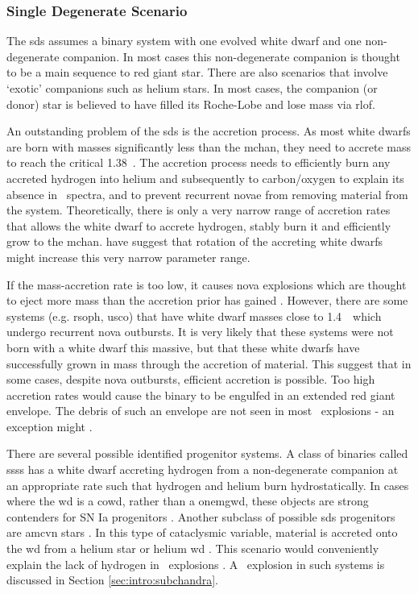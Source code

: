 \subsubsection{Single Degenerate Scenario}
The \gls{sds} assumes a binary system with one evolved white dwarf and one non-degenerate companion. In most cases this non-degenerate companion is thought to be a main sequence to red giant star. There are also scenarios that involve `exotic' companions such as helium stars. In most cases, the companion (or \gls{donor}) star is believed to have filled its Roche-Lobe and lose mass via \gls{rlof}.

An outstanding problem of the \gls{sds} is the accretion process.  As most white dwarfs are born with masses significantly less than the \gls{mchan}, they need to accrete mass to reach the critical 1.38~\msun. The accretion process needs to efficiently burn any accreted hydrogen into helium and subsequently to carbon/oxygen to explain its absence in \sneia\ spectra, and to prevent recurrent novae from removing material from the system. Theoretically, there is only a very narrow range of accretion rates that allows the white dwarf to accrete hydrogen, stably burn it and efficiently grow to the \gls{mchan}. \cite{2004A&A...419..623Y} have suggest that rotation of the accreting white dwarfs might increase this very narrow parameter range.

 If the mass-accretion rate is too low, it causes nova explosions which are thought to eject more mass than the accretion prior has gained \citep{Nomoto:1982p451}. However, there are some systems (e.g. \gls{rsoph}, \gls{usco}) that have white dwarf masses close to 1.4~\msun\ which undergo recurrent nova outbursts. It is very likely that these systems were not born with a white dwarf this massive, but that these white dwarfs have successfully grown in mass through the accretion of material. This suggest that in some cases, despite nova outbursts, efficient accretion is possible. Too high accretion rates would cause the binary to be engulfed in an extended red giant envelope. The debris of such an envelope are not seen in most \snia\ explosions - an exception might . 
 
There are several possible identified progenitor systems. A class of binaries called \glspl{sss} has a white dwarf accreting hydrogen from a non-degenerate companion at an appropriate rate such that hydrogen and helium burn hydrostatically. In cases where the \gls{wd} is a \gls{cowd}, rather than a \gls{onemgwd}, these objects are strong contenders for SN Ia progenitors \citep[][and references therein]{2006astro.ph..6364D}. Another subclass of possible \gls{sds} progenitors are \gls{amcvn} stars \citep{2005ASPC..330...27N}. In this type of cataclysmic variable, material is accreted onto the \gls{wd} from a helium star or helium \gls{wd} \citep{1992A&A...262...97V}. This scenario would conveniently explain the lack of hydrogen in \snia\ explosions . A \snia\ explosion in such systems is discussed in Section \vref{sec:intro:subchandra}.


